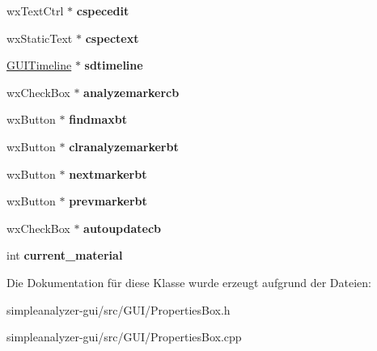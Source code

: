 \begin{DoxyCompactItemize}
\item 
\hypertarget{classPropertiesBox_a7cbf5d8a28ab3eb6e904f48b8a56550a}{wx\-Text\-Ctrl $\ast$ {\bfseries cspecedit}}\label{classPropertiesBox_a7cbf5d8a28ab3eb6e904f48b8a56550a}

\item 
\hypertarget{classPropertiesBox_a050b914859a2d7519eb0272e035441dc}{wx\-Static\-Text $\ast$ {\bfseries cspectext}}\label{classPropertiesBox_a050b914859a2d7519eb0272e035441dc}

\item 
\hypertarget{classPropertiesBox_ab1ddf5249a31c0f47f43241bf58d8792}{\hyperlink{classGUITimeline}{G\-U\-I\-Timeline} $\ast$ {\bfseries sdtimeline}}\label{classPropertiesBox_ab1ddf5249a31c0f47f43241bf58d8792}

\item 
\hypertarget{classPropertiesBox_ab7eca6c3c7627b7f980dc3c109517ae7}{wx\-Check\-Box $\ast$ {\bfseries analyzemarkercb}}\label{classPropertiesBox_ab7eca6c3c7627b7f980dc3c109517ae7}

\item 
\hypertarget{classPropertiesBox_a6ad61bdec114e3782d4c70bb4088ab84}{wx\-Button $\ast$ {\bfseries findmaxbt}}\label{classPropertiesBox_a6ad61bdec114e3782d4c70bb4088ab84}

\item 
\hypertarget{classPropertiesBox_aec2aca2e799dcbcaabc0a99b5613810f}{wx\-Button $\ast$ {\bfseries clranalyzemarkerbt}}\label{classPropertiesBox_aec2aca2e799dcbcaabc0a99b5613810f}

\item 
\hypertarget{classPropertiesBox_a1d7d3528b98ffd4669be01da744be5ca}{wx\-Button $\ast$ {\bfseries nextmarkerbt}}\label{classPropertiesBox_a1d7d3528b98ffd4669be01da744be5ca}

\item 
\hypertarget{classPropertiesBox_a3e800c14e5b36278838208e75c46939b}{wx\-Button $\ast$ {\bfseries prevmarkerbt}}\label{classPropertiesBox_a3e800c14e5b36278838208e75c46939b}

\item 
\hypertarget{classPropertiesBox_a8e1e80e3ca3bdac18b0bcfc07658cd9b}{wx\-Check\-Box $\ast$ {\bfseries autoupdatecb}}\label{classPropertiesBox_a8e1e80e3ca3bdac18b0bcfc07658cd9b}

\item 
\hypertarget{classPropertiesBox_a83244ddd61bfd31452a3a975b107becb}{int {\bfseries current\-\_\-material}}\label{classPropertiesBox_a83244ddd61bfd31452a3a975b107becb}

\end{DoxyCompactItemize}


Die Dokumentation für diese Klasse wurde erzeugt aufgrund der Dateien\-:\begin{DoxyCompactItemize}
\item 
simpleanalyzer-\/gui/src/\-G\-U\-I/Properties\-Box.\-h\item 
simpleanalyzer-\/gui/src/\-G\-U\-I/Properties\-Box.\-cpp\end{DoxyCompactItemize}
